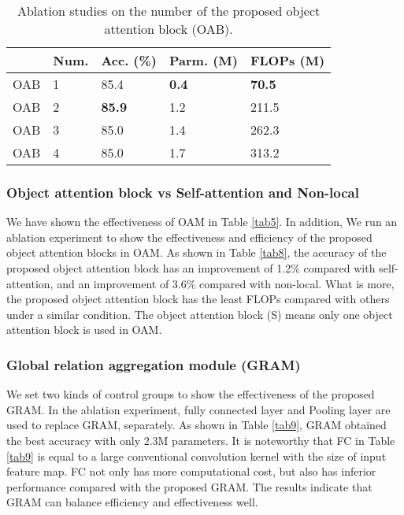 \documentclass[letterpaper, 10 pt, conference]{ieeeconf}  %
\begin{document}
\begin{tiny}
\begin{table}[tp!]
\centering
\caption{Ablation studies on the number of the proposed object attention block (OAB).}\label{tab7}
\begin{tabular}{lllll}
\hline
&Num.&Acc. (\%)&Parm. (M)&FLOPs (M)\\
\hline
OAB&1&85.4&\textbf{0.4}&\textbf{70.5}\\
OAB&2&\textbf{85.9}&1.2&211.5\\
OAB&3&85.0&1.4&262.3\\
OAB&4&85.0&1.7&313.2\\
\hline
\end{tabular}
\vspace{-2mm}
\end{table}
\end{tiny}

\vspace{1mm}
\subsubsection{Object attention block vs Self-attention and Non-local}
\label{Object attention block vs Self-attention and Non-local}

We have shown the effectiveness of OAM in Table \ref{tab5}. In addition, We run an ablation experiment to show the effectiveness and efficiency of the proposed object attention blocks in OAM. As shown in Table \ref{tab8}, the accuracy of the proposed object attention block has an improvement of 1.2\% compared with self-attention, and an improvement of 3.6\% compared with non-local. What is more, the proposed object attention block has the least FLOPs compared with others under a similar condition. The object attention block (S) means only one object attention block is used in OAM.

\vspace{1mm}
\subsubsection{Global relation aggregation module (GRAM)}
\label{Global relation aggregation module (GRAM)}

We set two kinds of control groups to show the effectiveness of the proposed GRAM. In the ablation experiment, fully connected layer and Pooling layer are used to replace GRAM, separately. As shown in Table \ref{tab9}, GRAM obtained the best accuracy with only 2.3M parameters. It is noteworthy that FC in Table \ref{tab9} is equal to a large conventional convolution kernel with the size of input feature map. FC not only has more computational cost, but also has inferior performance compared with the proposed GRAM. The results indicate that GRAM can balance efficiency and effectiveness well.
\end{document}
